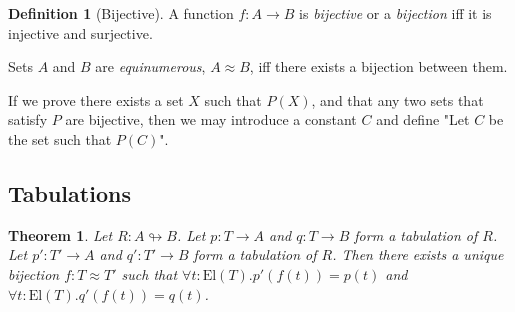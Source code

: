 \documentclass{book}
\newtheorem{thm}[ax]{Theorem}
\theoremstyle{definition}
\newtheorem{df}[ax]{Definition}
\newcommand{\El}[1]{\ensuremath{\mathrm{El} \left( {#1} \right)}}
\begin{document}
\begin{df}[Bijective]
A function $f : A \rightarrow B$ is \emph{bijective} or a \emph{bijection} iff it is injective and surjective.

Sets $A$ and $B$ are \emph{equinumerous}, $A \approx B$, iff there exists a bijection between them.
\end{df}

If we prove there exists a set $X$ such that $P(X)$, and that any two sets that satisfy $P$ are bijective, then we may introduce a constant $C$ and define "Let $C$ be the set such that $P(C)$".

\subsection{Tabulations}

\begin{thm}
Let $R : A \looparrowright B$. Let $p : T \rightarrow A$ and $q : T \rightarrow B$ form a tabulation of $R$. Let $p' : T' \rightarrow A$ and $q' : T' \rightarrow B$ form a tabulation of $R$. Then there exists a unique bijection $f : T \approx T'$ such that $\forall t : \El{T}. p'(f(t)) = p(t)$ and $\forall t : \El{T}. q'(f(t)) = q(t)$.
\end{thm}
\end{document}
